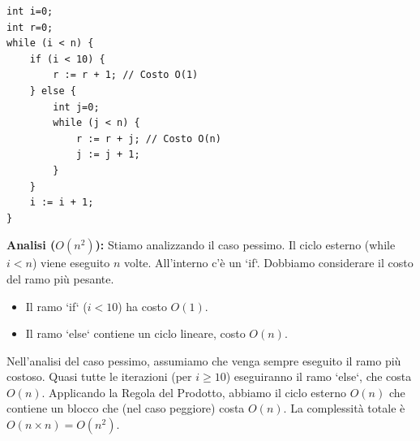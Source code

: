 \begin{example}
\begin{lstlisting}[language={}, basicstyle=\ttfamily\bfseries, backgroundcolor=\color{codegray}, frame=tb, numbers=none, breaklines=true, tabsize=2]
int i=0;
int r=0;
while (i < n) {
    if (i < 10) {
        r := r + 1; // Costo O(1)
    } else {
        int j=0;
        while (j < n) {
            r := r + j; // Costo O(n)
            j := j + 1;
        }
    }
    i := i + 1;
}
\end{lstlisting}
\textbf{Analisi ($O(n^2)$):} Stiamo analizzando il caso pessimo. Il ciclo esterno (while $i<n$) viene eseguito $n$ volte. All'interno c'è un `if`. Dobbiamo considerare il costo del ramo più pesante.
\begin{itemize}
    \item Il ramo `if` ($i<10$) ha costo $O(1)$.
    \item Il ramo `else` contiene un ciclo lineare, costo $O(n)$.
\end{itemize}
Nell'analisi del caso pessimo, assumiamo che venga sempre eseguito il ramo più costoso. Quasi tutte le iterazioni (per $i \ge 10$) eseguiranno il ramo `else`, che costa $O(n)$.
Applicando la Regola del Prodotto, abbiamo il ciclo esterno $O(n)$ che contiene un blocco che (nel caso peggiore) costa $O(n)$. La complessità totale è $O(n \times n) = O(n^2)$.
\end{example}

\newpage